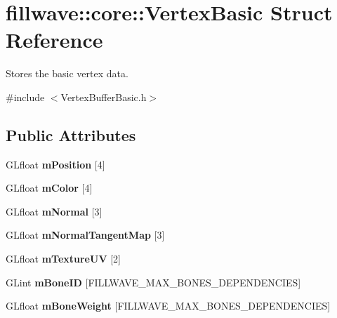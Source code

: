 \hypertarget{structfillwave_1_1core_1_1VertexBasic}{}\section{fillwave\+:\+:core\+:\+:Vertex\+Basic Struct Reference}
\label{structfillwave_1_1core_1_1VertexBasic}


Stores the basic vertex data.  




{\ttfamily \#include $<$Vertex\+Buffer\+Basic.\+h$>$}

\subsection*{Public Attributes}
\begin{DoxyCompactItemize}
\item 
\hypertarget{structfillwave_1_1core_1_1VertexBasic_a30b8941633c83dd7fe631caa6029cecf}{}G\+Lfloat {\bfseries m\+Position} \mbox{[}4\mbox{]}\label{structfillwave_1_1core_1_1VertexBasic_a30b8941633c83dd7fe631caa6029cecf}

\item 
\hypertarget{structfillwave_1_1core_1_1VertexBasic_aae52f49175d4bc99bd24644312717704}{}G\+Lfloat {\bfseries m\+Color} \mbox{[}4\mbox{]}\label{structfillwave_1_1core_1_1VertexBasic_aae52f49175d4bc99bd24644312717704}

\item 
\hypertarget{structfillwave_1_1core_1_1VertexBasic_a50f4f4cd490740439ad1b0c97238096c}{}G\+Lfloat {\bfseries m\+Normal} \mbox{[}3\mbox{]}\label{structfillwave_1_1core_1_1VertexBasic_a50f4f4cd490740439ad1b0c97238096c}

\item 
\hypertarget{structfillwave_1_1core_1_1VertexBasic_a5e348498d242deacf1890bcc4ff69526}{}G\+Lfloat {\bfseries m\+Normal\+Tangent\+Map} \mbox{[}3\mbox{]}\label{structfillwave_1_1core_1_1VertexBasic_a5e348498d242deacf1890bcc4ff69526}

\item 
\hypertarget{structfillwave_1_1core_1_1VertexBasic_a1760591b3bc55c74a55db33256f7ed22}{}G\+Lfloat {\bfseries m\+Texture\+U\+V} \mbox{[}2\mbox{]}\label{structfillwave_1_1core_1_1VertexBasic_a1760591b3bc55c74a55db33256f7ed22}

\item 
\hypertarget{structfillwave_1_1core_1_1VertexBasic_a0d6aec392bce404e284bc6b5e85c682b}{}G\+Lint {\bfseries m\+Bone\+I\+D} \mbox{[}F\+I\+L\+L\+W\+A\+V\+E\+\_\+\+M\+A\+X\+\_\+\+B\+O\+N\+E\+S\+\_\+\+D\+E\+P\+E\+N\+D\+E\+N\+C\+I\+E\+S\mbox{]}\label{structfillwave_1_1core_1_1VertexBasic_a0d6aec392bce404e284bc6b5e85c682b}

\item 
\hypertarget{structfillwave_1_1core_1_1VertexBasic_af61249f1f645b650258854d4af2887e0}{}G\+Lfloat {\bfseries m\+Bone\+Weight} \mbox{[}F\+I\+L\+L\+W\+A\+V\+E\+\_\+\+M\+A\+X\+\_\+\+B\+O\+N\+E\+S\+\_\+\+D\+E\+P\+E\+N\+D\+E\+N\+C\+I\+E\+S\mbox{]}\label{structfillwave_1_1core_1_1VertexBasic_af61249f1f645b650258854d4af2887e0}

\end{DoxyCompactItemize}


